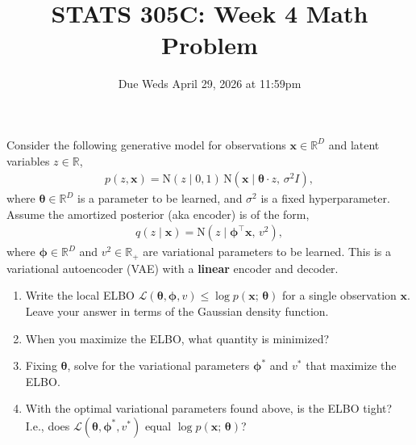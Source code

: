 \documentclass[11pt]{article}
\title{STATS 305C: Week 4 Math Problem}
\date{Due Weds April 29, 2026 at 11:59pm}
\begin{document}
\maketitle
\noindent
Consider the following generative model for observations $\mathbf{x} \in \mathbb{R}^D$
and latent variables $z \in \mathbb{R}$,
\begin{align*}
    p(z, \mathbf{x}) = \mathrm{N}(z \mid 0, 1)\,\mathrm{N}(\mathbf{x} \mid \boldsymbol{\theta} \cdot z,\, \sigma^2 I),
\end{align*}
where $\boldsymbol{\theta} \in \mathbb{R}^D$ is a parameter to be learned, and $\sigma^2$ is a
fixed hyperparameter. Assume the amortized posterior (aka encoder) is of the form,
\begin{align*}
    q(z \mid \mathbf{x}) = \mathrm{N}(z \mid \boldsymbol{\phi}^\top \mathbf{x},\, v^2),
\end{align*}
where $\boldsymbol{\phi} \in \mathbb{R}^D$ and $v^2 \in \mathbb{R}_+$ are variational
parameters to be learned. This is a variational autoencoder (VAE) with a \textbf{linear}
encoder and decoder.

\begin{enumerate}[label=(\alph*)]
    \item Write the local ELBO $\mathcal{L}(\boldsymbol{\theta}, \boldsymbol{\phi}, v)
    \leq \log p(\mathbf{x};\, \boldsymbol{\theta})$ for a single observation $\mathbf{x}$.
    Leave your answer in terms of the Gaussian density function.

    \item When you maximize the ELBO, what quantity is minimized?

    \item Fixing $\boldsymbol{\theta}$, solve for the variational parameters
    $\boldsymbol{\phi}^*$ and $v^*$ that maximize the ELBO.

    \item With the optimal variational parameters found above, is the ELBO tight?
    I.e., does $\mathcal{L}(\boldsymbol{\theta}, \boldsymbol{\phi}^*, v^*)$ equal
    $\log p(\mathbf{x};\, \boldsymbol{\theta})$?
\end{enumerate}
\end{document}
